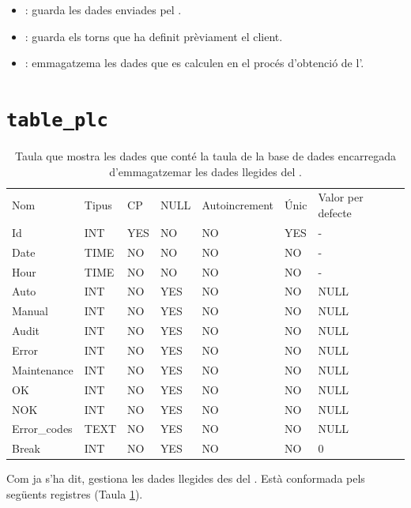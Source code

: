 \documentclass{tfgitic}[2022/06/30]
\begin{document}
\begin{itemize}
    \item {}: guarda les dades enviades pel .
    \item {}: guarda els torns que ha definit prèviament el client.
    \item {}: emmagatzema les dades que es calculen en el procés d'obtenció de l'.
\end{itemize}

\section{\texttt{table\_plc}}

\begin{table}[h]
\centering
\label{table:tablePlc}
\begin{tabular}{
>{\columncolor[HTML]{EBEAEA}}l llllll}
\cellcolor[HTML]{D3D3D3} Nom & \cellcolor[HTML]{D3D3D3} Tipus & \cellcolor[HTML]{D3D3D3} CP&  \cellcolor[HTML]{D3D3D3} NULL & \cellcolor[HTML]{D3D3D3} Autoincrement & \cellcolor[HTML]{D3D3D3} Únic& \cellcolor[HTML]{D3D3D3} Valor per defecte\\
Id & INT & YES & NO & NO & YES & - \\
Date & TIME & NO & NO & NO & NO &  - \\
Hour & TIME & NO & NO & NO & NO & -  \\
Auto & INT & NO & YES & NO & NO & NULL \\
Manual & INT & NO & YES & NO & NO & NULL \\
Audit & INT & NO & YES & NO & NO & NULL \\
Error & INT & NO & YES & NO & NO & NULL \\
Maintenance & INT & NO & YES & NO & NO & NULL \\
OK & INT & NO & YES & NO & NO & NULL \\
NOK & INT & NO & YES & NO & NO & NULL \\
Error\_codes & TEXT & NO & YES & NO & NO & NULL \\
Break & INT & NO & YES & NO & NO & 0 
\end{tabular}
\caption{Taula que mostra les dades que conté la taula de la base de dades encarregada d'emmagatzemar les dades llegides del .}
\end{table}


Com ja s'ha dit, gestiona les dades llegides des del . Està conformada pels següents registres (Taula \ref{table:tablePlc}).
\end{document}
